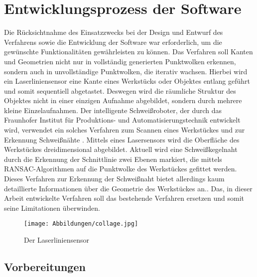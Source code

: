 

\chapter{Entwicklungsprozess der Software}
Die Rücksichtnahme des Einsatzzwecks bei der Design und Entwurf des Verfahrens sowie die Entwicklung der Software war erforderlich, um die gewünschte Funktionalitäten gewährleisten zu können. Das Verfahren soll Kanten und Geometrien nicht nur in vollständig generierten Punktwolken erkennen, sondern auch in unvollständige Punktwolken, die iterativ wachsen. Hierbei wird ein Laserliniensensor eine Kante eines Werkstücks oder Objektes entlang geführt und somit sequentiell abgetastet. Deswegen wird die räumliche Struktur des Objektes nicht in einer einzigen Aufnahme abgebildet, sondern durch mehrere kleine Einzelaufnahmen. Der intelligente Schweißroboter, der durch das Fraunhofer Institut für Produktions- und Automatisierungstechnik entwickelt wird, verwendet ein solches Verfahren zum Scannen eines Werkstückes und zur Erkennung Schweißnähte \autocite[39]{savla_intelligente_2022}. Mittels eines Lasersensors wird die Oberfläche des Werkstückes dreidimensional abgebildet. Aktuell wird eine Schweißkegelnaht durch die Erkennung der Schnittlinie zwei Ebenen markiert, die mittels RANSAC-Algorithmen auf die Punktwolke des Werkstückes gefittet werden. Dieses Verfahren zur Erkennung der Schweißnaht bietet allerdings kaum detaillierte Informationen über die Geometrie des Werkstückes an.\autocite[39-52]{savla_intelligente_2022}. Das, in dieser Arbeit entwickelte Verfahren soll das bestehende Verfahren ersetzen und somit seine Limitationen überwinden.

\begin{figure}[h]
	\texttt{[image: Abbildungen/collage.jpg]}
	\centering
	\caption{Der Laserliniensensor} 
\end{figure}

\section{Vorbereitungen} \label{agpn_reproduction}
